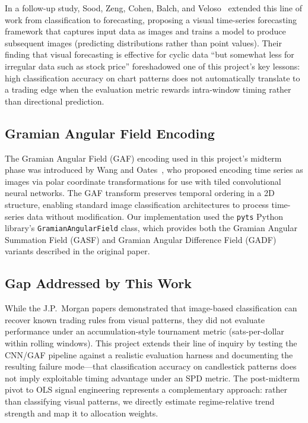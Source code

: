 \documentclass[11pt,letterpaper]{article}
\begin{document}
In a follow-up study, Sood, Zeng, Cohen, Balch, and Veloso~\cite{sood2021}
extended this line of work from classification to forecasting, proposing a visual
time-series forecasting framework that captures input data as images and trains a
model to produce subsequent images (predicting distributions rather than point
values).  Their finding that visual forecasting is effective for cyclic data ``but
somewhat less for irregular data such as stock price'' foreshadowed one of this
project's key lessons: high classification accuracy on chart patterns does not
automatically translate to a trading edge when the evaluation metric rewards
intra-window timing rather than directional prediction.

\subsection{Gramian Angular Field Encoding}

The Gramian Angular Field (GAF) encoding used in this project's midterm phase was
introduced by Wang and Oates~\cite{wang2015}, who proposed encoding time series as
images via polar coordinate transformations for use with tiled convolutional
neural networks.  The GAF transform preserves temporal ordering in a 2D structure,
enabling standard image classification architectures to process time-series data
without modification.  Our implementation used the \texttt{pyts} Python
library's \texttt{GramianAngularField} class, which provides both the Gramian
Angular Summation Field (GASF) and Gramian Angular Difference Field (GADF)
variants described in the original paper.

\subsection{Gap Addressed by This Work}

While the J.P.~Morgan papers demonstrated that image-based classification can
recover known trading rules from visual patterns, they did not evaluate
performance under an accumulation-style tournament metric (sats-per-dollar within
rolling windows).  This project extends their line of inquiry by testing the
CNN/GAF pipeline against a realistic evaluation harness and documenting the
resulting failure mode---that classification accuracy on candlestick patterns does
not imply exploitable timing advantage under an SPD metric.  The post-midterm
pivot to OLS signal engineering represents a complementary approach: rather than
classifying visual patterns, we directly estimate regime-relative trend strength
and map it to allocation weights.
\end{document}
